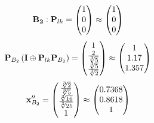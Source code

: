 \documentclass[10pt,a4paper]{article}
\begin{document}
	\[
		\bold{B_2}: \bold{P}_{lk} = 
		\begin{pmatrix}
			{1} {} \\
			{{0}} {} \\
			{{0}} {} \\
		\end{pmatrix}
		\approx
		\begin{pmatrix}
			1        \\
			0        \\
			0        \\
		\end{pmatrix}
	\]
	\[
		\bold{P}_{B_2}\left(\bold{I} \oplus \bold{P}_{lk}\bold{P}_{B_2}\right) = 
		\begin{pmatrix}
			{1} {} \\
			\frac{{2}} {\sqrt[3]{5}} \\
			\frac{\sqrt[3]{5}} {\sqrt[3]{2}} \\
		\end{pmatrix}
		\approx
		\begin{pmatrix}
			1        \\
			1.17     \\
			1.357    \\
		\end{pmatrix}
	\]
	\[
		\bold{x}''_{B_2} = 
		\begin{pmatrix}
			\frac{\sqrt[3]{2}} {\sqrt[3]{5}} \\
			\frac{\sqrt[3]{16}} {\sqrt[3]{25}} \\
			{1} {} \\
		\end{pmatrix}
		\approx
		\begin{pmatrix}
			0.7368   \\
			0.8618   \\
			1        \\
		\end{pmatrix}
	\]

\end{document}
